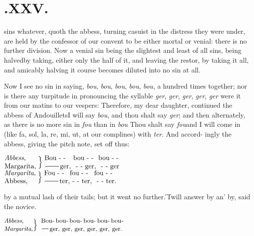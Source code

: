 \documentclass{article}
\begin{document}
\section{.\enspace XXV.}

 sins whatever, quoth the abbess,
turning casuist in the distress they were under, are held by the
confessor of our convent to be either mortal or venial:\break
there is no further division. Now a venial sin being the
slightest and least of all sins,\break
\tsk being halved\tsk by taking, either only the half of it, and
leaving the rest\tsk or, by taking it all, and amicably halving
it  course becomes
diluted into no sin at all.

\bigskip
{}\eject

Now I see no sin in saying, \textit{bou}, \textit{bou}, \textit{bou}, \textit{bou},
\textit{bou}, a hundred times together; nor is there any turpitude in pronouncing
the syllable \textit{ger}, \textit{ger}, \textit{ger}, \textit{ger}, \textit{ger}
were it from our matins to our vespers: Therefore, my dear daughter, continued the
abbess of Andouillets\sic\tsk I will say \textit{bou}, and thou shalt say \textit{ger};
and then alternately, as there is no more sin in \textit{fou}
than in \textit{bou}\tsk
Thou shalt say \textit{fou}\tsk and I will come in (like fa,
sol, la, re, mi, ut, at\break
our complines) with \textit{ter}. And accord-\break
ingly the abbess, giving the pitch note,
set off thus:

\noindent$
\vcenter{\halign{#\hss\cr
\textit{Abbess},\cr 
Margarita,\cr}}\;\Big\}\;
\vcenter{\halign{&#\hss\cr
Bou - - &bou - - &bou - -\cr
\tsh ger, &\hbox to 14pt{ - -} ger, &\hbox to 14pt{ - -} ger\cr}}
$\\[4pt]
$
\vcenter{\halign{#\hss\cr
\textit{Margarita},\cr 
Abbess,\cr}}\;\Big\}\;
\vcenter{\halign{&#\hss\cr
Fou - - &fou - - &fou - -\cr
\tsh ter,&\hbox to 14pt{ - -} ter, &\hbox to 14pt{ - -} ter.\cr}}
$

\smallskip
{}\eject

\break
by a mutual lash of their tails; but it\break
went no further.\tsh ’Twill answer by an’\break
by, said the novice.\\[6pt]
\centerline{$\vcenter{\halign{\small #\hss\cr
\textit{Abbess},\cr 
\textit{Margarita},\cr}}\Big\}$
\hss
$\vcenter{\halign{\hbox to 119pt{\small #}\cr
Bou- bou- bou- bou- bou- bou-\cr
\tsk ger, ger, ger, ger, ger, ger.\cr}}$}
\end{document}
